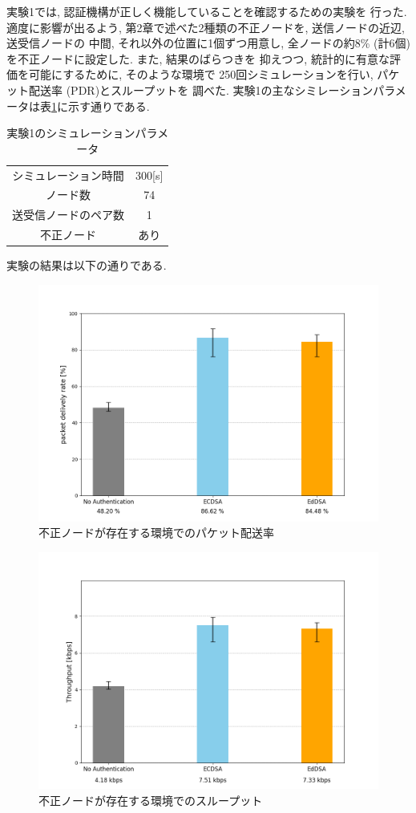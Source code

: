実験1では, 認証機構が正しく機能していることを確認するための実験を
行った. 適度に影響が出るよう, 第2章で述べた2種類の不正ノードを, 送信ノードの近辺, 送受信ノードの
中間, それ以外の位置に1個ずつ用意し, 
全ノードの約8\% (計6個)を不正ノードに設定した. また, 結果のばらつきを
抑えつつ, 統計的に有意な評価を可能にするために, そのような環境で
250回シミュレーションを行い, パケット配送率 (PDR)とスループットを
調べた. 実験1の主なシミレーションパラメータは表\ref{tab:exp1-params}に示す通りである.
\begin{longtable}{cc}
  \caption{実験1のシミュレーションパラメータ}
  \label{tab:exp1-params}
  \endfirsthead
  \hline
  シミュレーション時間 & 300[s] \\
  ノード数 & 74 \\
  送受信ノードのペア数 & 1 \\ 
  不正ノード & あり \\ \hline
\end{longtable}
\indent 実験の結果は以下の通りである. \\
\begin{figure}
  \centering
  \includegraphics[width=1\textwidth]{figures/exp1_pdr.png}
  \caption{不正ノードが存在する環境でのパケット配送率}
  \label{fig:exp1_pdr}
\end{figure}
\clearpage
\begin{figure}
  \centering
  \includegraphics[width=1\textwidth]{figures/exp1_throughput.png}
  \caption{不正ノードが存在する環境でのスループット}
  \label{fig:exp1_throughput}
\end{figure}



